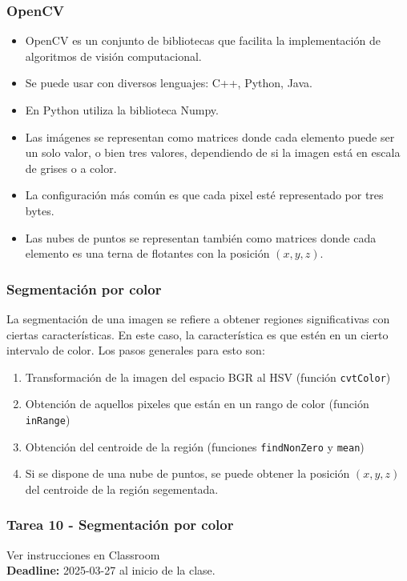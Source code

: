 \begin{frame}\frametitle{OpenCV}
  \begin{itemize}
  \item OpenCV es un conjunto de bibliotecas que facilita la implementación de algoritmos de visión computacional.
  \item Se puede usar con diversos lenguajes: C++, Python, Java.
  \item En Python utiliza la biblioteca Numpy.
  \item Las imágenes se representan como matrices donde cada elemento puede ser un solo valor, o bien tres valores, dependiendo de si la imagen está en escala de grises o a color.
  \item La configuración más común es que cada pixel esté representado por tres bytes.
  \item Las nubes de puntos se representan también como matrices donde cada elemento es una terna de flotantes con la posición $(x,y,z)$.
  \end{itemize}
\end{frame}

\begin{frame}\frametitle{Segmentación por color}
  La segmentación de una imagen se refiere a obtener regiones significativas con ciertas características. En este caso, la característica es que estén en un cierto intervalo de color. Los pasos generales para esto son:
  \begin{enumerate}
  \item Transformación de la imagen del espacio BGR al HSV (función \texttt{cvtColor})
  \item Obtención de aquellos pixeles que están en un rango de color (función \texttt{inRange})
  \item Obtención del centroide de la región (funciones \texttt{findNonZero} y \texttt{mean})
  \item Si se dispone de una nube de puntos, se puede obtener la posición $(x,y,z)$ del centroide de la región segementada. 
  \end{enumerate}
\end{frame}

\begin{frame}[containsverbatim]\frametitle{Tarea 10 - Segmentación por color}
  Ver instrucciones en Classroom
  \[\]
  \textbf{Deadline: } 2025-03-27 al inicio de la clase. 
\end{frame}

